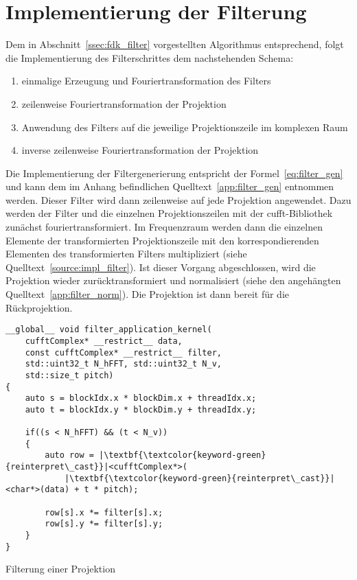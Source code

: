 \section{Implementierung der Filterung}

Dem in Abschnitt~\ref{ssec:fdk_filter} vorgestellten Algorithmus entsprechend, folgt die Implementierung des
Filterschrittes dem nachstehenden Schema:

\begin{enumerate}
    \item einmalige Erzeugung und Fouriertransformation des Filters
    \item zeilenweise Fouriertransformation der Projektion
    \item Anwendung des Filters auf die jeweilige Projektionszeile im komplexen Raum
    \item inverse zeilenweise Fouriertransformation der Projektion
\end{enumerate}

Die Implementierung der Filtergenerierung entspricht der Formel~\ref{eq:filter_gen} und kann dem im Anhang befindlichen
Quelltext~\ref{app:filter_gen} entnommen werden. Dieser Filter wird dann zeilenweise auf jede Projektion angewendet.
Dazu werden der Filter und die einzelnen Projektionszeilen mit der \gls{cufft}-Bibliothek zunächst fouriertransformiert.
Im Frequenzraum werden dann die einzelnen Elemente der transformierten Projektionszeile mit den korrespondierenden
Elementen des transformierten Filters multipliziert (siehe Quelltext~\ref{source:impl_filter}). Ist dieser Vorgang
abgeschlossen, wird die Projektion wieder zurücktransformiert und normalisiert (siehe den angehängten
Quelltext~\ref{app:filter_norm}). Die Projektion ist dann bereit für die Rückprojektion.

\begin{listing}
\begin{verbatim}
__global__ void filter_application_kernel(
    cufftComplex* __restrict__ data,
    const cufftComplex* __restrict__ filter,
    std::uint32_t N_hFFT, std::uint32_t N_v,
    std::size_t pitch)
{
    auto s = blockIdx.x * blockDim.x + threadIdx.x;
    auto t = blockIdx.y * blockDim.y + threadIdx.y;

    if((s < N_hFFT) && (t < N_v))
    {
        auto row = |\textbf{\textcolor{keyword-green}{reinterpret\_cast}}|<cufftComplex*>(
            |\textbf{\textcolor{keyword-green}{reinterpret\_cast}}|<char*>(data) + t * pitch);

        row[s].x *= filter[s].x;
        row[s].y *= filter[s].y;
    }
}
\end{verbatim}
\caption{Filterung einer Projektion}
\label{source:impl_filter}
\end{listing}

